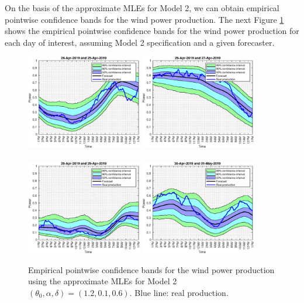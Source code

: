\documentclass[11pt]{article}
\theoremstyle{definition}
\begin{document}
On the basis of the approximate MLEs for Model 2, we can obtain empirical pointwise confidence bands for the wind power production. The next Figure \ref{fig:confidence_bands} shows the empirical pointwise confidence bands for the wind power production for each day of interest, assuming Model 2 specification and a given forecaster.

\begin{figure}[H]
\centering
\includegraphics[width=0.45\textwidth]{../../MATLAB_Files/Results/bands_testing_days/optimal_value/withDate/1.eps}
\includegraphics[width=0.45\textwidth]{../../MATLAB_Files/Results/bands_testing_days/optimal_value/withDate/2.eps}\\
\quad\\
\includegraphics[width=0.45\textwidth]{../../MATLAB_Files/Results/bands_testing_days/optimal_value/withDate/3.eps}
\includegraphics[width=0.45\textwidth]{../../MATLAB_Files/Results/bands_testing_days/optimal_value/withDate/4.eps}
\caption{Empirical pointwise confidence bands for the wind power production using the approximate MLEs for Model 2 $(\theta_0, \alpha ,\delta)=(1.2,0.1,0.6)$. Blue line: real production.}
\label{fig:confidence_bands}
\end{figure}
\end{document}
